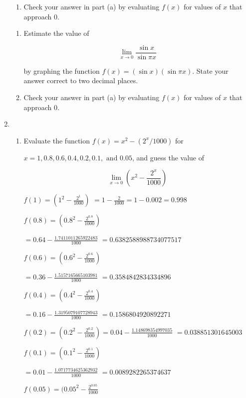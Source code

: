 \documentclass{article}
\begin{document}
\begin{enumerate}
\begin{enumerate}
				\item Check your answer in part (a) by evaluating $f(x)$ for values of $x$ that approach 0.
			\end{enumerate}
			
			\begin{enumerate}
				\item Estimate the value of
				
					$$\lim \limits _{x \to 0} \frac{\sin x}{\sin \pi x}$$
					
					by graphing the function $f(x) = (\sin x)(\sin \pi x)$. State your answer correct to
					two decimal places.
					
				\item Check your answer in part (a) by evaluating  $f(x)$ for values of $x$ that approach 0.
			\end{enumerate}
			
		\item 
			\begin{enumerate}
				\item Evaluate the function $f(x) = x^2 - (2^x/1000)$ for 
				
				$x = 1, 0.8, 0.6, 0.4, 0.2, 0.1, \text{ and } 0.05$, and guess the value of
				
					$$\lim \limits _{x \to 0} (x^2 - \frac{2^x}{1000})$$
					
				$f(1) = (1^2 - \frac{2^1}{1000})$ 
				$= 1 - \frac{2}{1000} = 1 - 0.002 = 0.998$
				
				$f(0.8) = (0.8^2 - \frac{2^{0.8}}{1000}) $
				
				$ = 0.64 - \frac{1.7411011265922483}{1000}$
				$= 0.6382588988734077517$
				
				$f(0.6) = (0.6^2 - \frac{2^{0.6}}{1000})$ 
				
				$ = 0.36 - \frac{1.5157165665103981}{1000}$
				$ = 0.3584842834334896$
				
				$f(0.4) = (0.4^2 - \frac{2^{0.4}}{1000}) $ 
				
				$= 0.16 - \frac{1.3195079107728943}{1000}$
				$ = 0.1586804920892271$
				
				$f(0.2) = (0.2^2 - \frac{2^{0.2}}{1000}) = 0.04 - \frac{1.148698354997035}{1000}$
				$ = 0.038851301645003$
				
				$f(0.1) = (0.1^2 - \frac{2^{0.1}}{1000})$
				
				$ = 0.01 - \frac{1.0717734625362932}{1000}$
				$ = 0.0089282265374637$
				
				$f(0.05) = (0.05^2 - \frac{2^{0.05}}{1000} $
				

\end{enumerate}
\end{enumerate}
\end{document}
